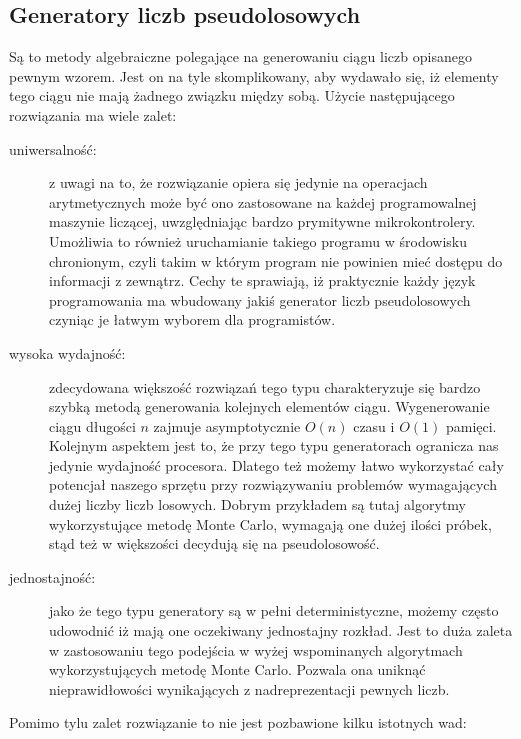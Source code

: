 \subsection{Generatory liczb pseudolosowych}
Są to metody algebraiczne polegające na generowaniu ciągu liczb opisanego pewnym wzorem. Jest on na tyle skomplikowany, aby wydawało się, iż elementy tego ciągu nie mają żadnego związku między sobą. Użycie następującego rozwiązania ma wiele zalet:
\begin{description}
\item[uniwersalność:] z uwagi na to, że rozwiązanie opiera się jedynie na operacjach arytmetycznych może być ono zastosowane na każdej programowalnej maszynie liczącej, uwzględniając bardzo prymitywne mikrokontrolery. Umożliwia to również uruchamianie takiego programu w środowisku chronionym, czyli takim w którym program nie powinien mieć dostępu do informacji z zewnątrz. Cechy te sprawiają, iż praktycznie każdy język programowania ma wbudowany jakiś generator liczb pseudolosowych czyniąc je łatwym wyborem dla programistów.
\item[wysoka wydajność:] zdecydowana większość rozwiązań tego typu charakteryzuje się bardzo szybką metodą generowania kolejnych elementów ciągu. Wygenerowanie ciągu długości $n$ zajmuje asymptotycznie $O(n)$ czasu i $O(1)$ pamięci. Kolejnym aspektem jest to, że przy tego typu generatorach ogranicza nas jedynie wydajność procesora. Dlatego też możemy łatwo wykorzystać cały potencjał naszego sprzętu przy rozwiązywaniu problemów wymagających dużej liczby liczb losowych. Dobrym przykładem są tutaj algorytmy wykorzystujące metodę Monte Carlo, wymagają one dużej ilości próbek, stąd też w większości decydują się na pseudolosowość.
\item[jednostajność:] jako że tego typu generatory są w pełni deterministyczne, możemy często udowodnić iż mają one oczekiwany jednostajny rozkład. Jest to duża zaleta w zastosowaniu tego podejścia w wyżej wspominanych algorytmach wykorzystujących metodę Monte Carlo. Pozwala ona uniknąć nieprawidłowości wynikających z nadreprezentacji pewnych liczb.
\end{description}
Pomimo tylu zalet rozwiązanie to nie jest pozbawione kilku istotnych wad:
